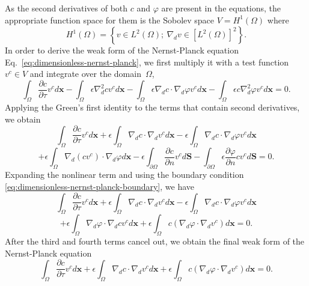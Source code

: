 As the second derivatives of both $c$ and $\varphi$ are present in the 
equations, the appropriate function space for them is the Sobolev space 
$V=H^1\left(\Omega\right)$ where 
$$H^1\left(\Omega\right)=\left\{v\in L^2\left(\Omega\right);\ \nabla_d v \in \left[L^2\left(\Omega\right)\right]^2\right\}.
$$
In order to derive the weak form of the Nernst-Planck equation Eq.~\eqref{eq:dimensionless-nernst-planck},
we first multiply it with a test function $v^c \in V$ and integrate over the domain~$\Omega$,
\begin{equation}
  \int_{\Omega}\frac{\partial c}{\partial \tau}v^c d\mathbf{x}-
  \int_{\Omega}\epsilon\nabla_d^2cv^c d\mathbf{x}-\int_{\Omega}\epsilon\nabla_d c\cdot\nabla_d\varphi v^c d\mathbf{x}-
  \int_{\Omega}\epsilon c\nabla_d^2\varphi v^c d\mathbf{x}=0.
  \label{eq:nernst-planck-weak1}
\end{equation}
Applying the Green's first identity to the terms that contain second derivatives,
we obtain
$$
 \int_{\Omega}\frac{\partial c}{\partial \tau}v^c d\mathbf{x}+
  \epsilon\int_{\Omega}\nabla_d c\cdot\nabla_d v^c d\mathbf{x}-
  \epsilon\int_{\Omega}\nabla_d c\cdot\nabla_d\varphi v^c d\mathbf{x}
$$
\begin{equation}
  + \epsilon\int_{\Omega}\nabla_d\left(cv^c\right)\cdot \nabla_d \varphi d\mathbf{x}
  -\epsilon\int_{\partial\Omega}\frac{\partial c}{\partial n}v^c d\mathbf{S}-
  \int_{\partial\Omega}\epsilon\frac{\partial\varphi}{\partial n}cv^c d\mathbf{S}=0.
  \label{eq:nernst-planck-weak2}
\end{equation}
Expanding the nonlinear term and using the boundary condition 
\eqref{eq:dimensionless-nernst-planck-boundary}, we have
$$
  \int_{\Omega}\frac{\partial c}{\partial \tau}v^c d\mathbf{x}+
  \epsilon\int_{\Omega}\nabla_d c\cdot\nabla_d v^c d\mathbf{x}-
  \epsilon\int_{\Omega}\nabla_d c\cdot\nabla_d\varphi v^c d\mathbf{x}
$$
\begin{equation}
  + \epsilon\int_{\Omega}\nabla_d \varphi \cdot \nabla_d c v^c d\mathbf{x}+
  \epsilon \int_{\Omega} c \left(\nabla_d\varphi\cdot\nabla_d v^c\right) d\mathbf{x}=0.
  \label{eq:nernst-planck-weak3}
\end{equation}
After the third and fourth terms cancel out, we obtain the final weak form of 
the Nernst-Planck equation
\begin{equation}
  \int_{\Omega}\frac{\partial c}{\partial \tau}v^c d\mathbf{x}+
  \epsilon\int_{\Omega}\nabla_d c\cdot\nabla_d v^c d\mathbf{x}+
  \epsilon \int_{\Omega} c \left(\nabla_d\varphi\cdot\nabla_d v^c\right) d\mathbf{x}=0.
  \label{eq:nernst-planck-weak-final}
\end{equation}
